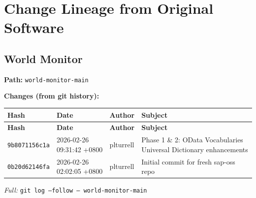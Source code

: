 \documentclass[11pt]{article}
\begin{document}
\newpage
\section{Change Lineage from Original Software}

\subsection{World Monitor}
\textbf{Path:} \texttt{world-monitor-main}

\textbf{Changes (from git history):}
\begin{longtable}{|p{2.2cm}|p{3.2cm}|l|p{6cm}|}
\hline \textbf{Hash} & \textbf{Date} & \textbf{Author} & \textbf{Subject} \\ \hline \endfirsthead
\hline \textbf{Hash} & \textbf{Date} & \textbf{Author} & \textbf{Subject} \\ \hline \endhead
\texttt{9b8071156c1a} & 2026-02-26 09:31:42 +0800 & plturrell & Phase 1 \& 2: OData Vocabularies Universal Dictionary enhancements \\
\texttt{0b20d62146fa} & 2026-02-26 02:02:05 +0800 & plturrell & Initial commit for fresh sap-oss repo \\
\hline
\end{longtable}
\textit{Full:} \texttt{git log --follow -- world-monitor-main}
\end{document}
